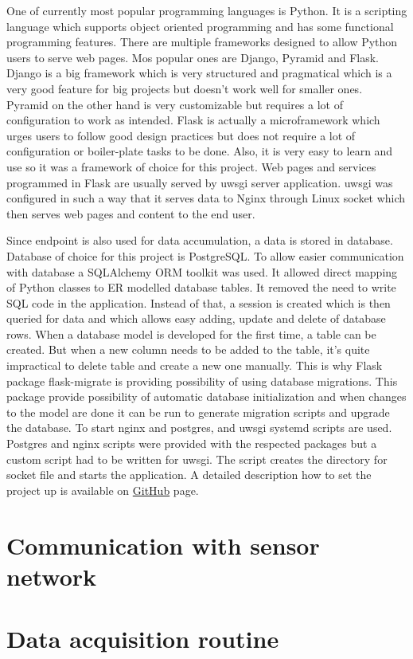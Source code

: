 One of currently most popular programming languages is Python. It is a scripting language which supports object oriented programming and has some functional programming features. There are multiple frameworks designed to allow Python users to serve web pages. Mos popular ones are Django, Pyramid and Flask. Django is a big framework which is very structured and pragmatical which is a very good feature for big projects but doesn't work well for smaller ones. Pyramid on the other hand is very customizable but requires a lot of configuration to work as intended. Flask is actually a microframework which urges users to follow good design practices but does not require a lot of configuration or boiler-plate tasks to be done. Also, it is very easy to learn and use so it was a framework of choice for this project. Web pages and services programmed in Flask are usually served by uwsgi server application. uwsgi was configured in such a way that it serves data to Nginx through Linux socket which then serves web pages and content to the end user.

Since endpoint is also used for data accumulation, a data is stored in database. Database of choice for this project is PostgreSQL. To allow easier communication with database a SQLAlchemy \ac{ORM} toolkit was used. It allowed direct mapping of Python classes to ER modelled database tables. It removed the need to write SQL code in the application. Instead of that, a session is created which is then queried for data and which allows easy adding, update and delete of database rows. When a database model is developed for the first time, a table can be created. But when a new column needs to be added to the table, it's quite impractical to delete table and create a new one manually. This is why Flask package flask-migrate is providing possibility of using database migrations. This package provide possibility of automatic database initialization and when changes to the model are done it can be run to generate migration scripts and upgrade the database. To start nginx and postgres, and uwsgi systemd scripts are used. Postgres and nginx scripts were provided with the respected packages but a custom script had to be written for uwsgi. The script creates the directory for socket file and starts the application. A detailed description how to set the project up is available on \href{github.com/Xenosb/thesis-edison}{GitHub} page.


\section{Communication with sensor network}




\section{Data acquisition routine}
